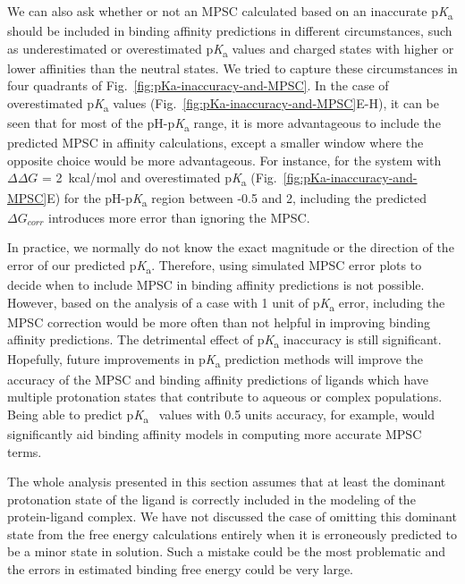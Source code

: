 \documentclass[9pt,lineno,final]{elife}
\newcommand{\pKa}{p\textit{K}\textsubscript{a}}
\begin{document}
We can also ask whether or not an MPSC calculated based on an inaccurate \pKa{} should be included in binding affinity predictions in different circumstances, such as underestimated or overestimated \pKa{} values and charged states with higher or lower affinities than the neutral states. 
We tried to capture these circumstances in four quadrants of Fig.~\ref{fig:pKa-inaccuracy-and-MPSC}. 
In the case of overestimated \pKa{} values (Fig.~\ref{fig:pKa-inaccuracy-and-MPSC}E-H), it can be seen that for most of the pH-\pKa{} range, it is more advantageous to include the predicted MPSC in affinity calculations, except a smaller window where the opposite choice would be more advantageous. 
For instance, for the system with $\Delta\Delta G$ = 2~kcal/mol and overestimated \pKa{} (Fig.~\ref{fig:pKa-inaccuracy-and-MPSC}E) for the pH-\pKa{} region between -0.5 and 2, including the predicted $\Delta G_{corr}$ introduces more error than ignoring the MPSC. 

In practice, we normally do not know the exact magnitude or the direction of the error of our predicted \pKa{}. 
Therefore, using simulated MPSC error plots to decide when to include MPSC in binding affinity predictions is not possible. 
However, based on the analysis of a case with 1 unit of \pKa{} error, including the MPSC correction would be more often than not helpful in improving binding affinity predictions. 
The detrimental effect of \pKa{} inaccuracy is still significant. 
Hopefully, future improvements in \pKa{} prediction methods will improve the accuracy of the MPSC and binding affinity predictions of ligands which have multiple protonation states that contribute to aqueous or complex populations. 
Being able to predict \pKa{}~ values with 0.5 units accuracy, for example, would significantly aid binding affinity models in computing more accurate MPSC terms.   

The whole analysis presented in this section assumes that at least the dominant protonation state of the ligand is correctly included in the modeling of the protein-ligand complex. We have not discussed the case of omitting this dominant state from the free energy calculations entirely when it is erroneously predicted to be a minor state in solution. Such a mistake could be the most problematic and the errors in estimated binding free energy could be very large.
\end{document}
